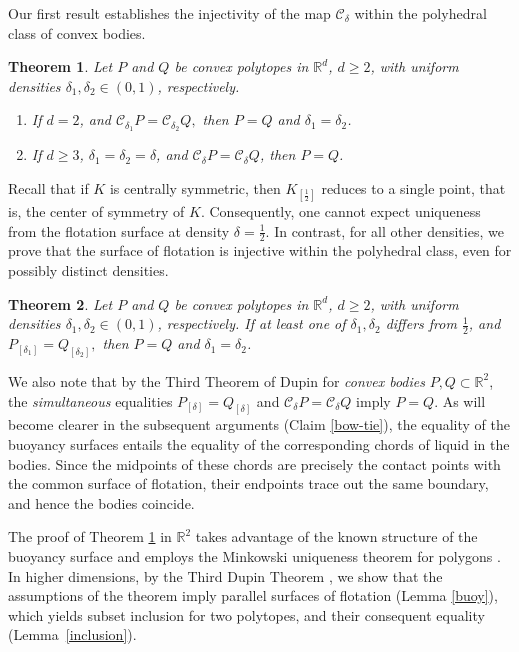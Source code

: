 \documentclass[12pt,letterpaper,reqno]{amsart}
\newtheorem{theorem}{Theorem}
\begin{document}
Our first result establishes the injectivity of the map
\(\mathcal{C}_\delta\) within the polyhedral class of convex bodies.

\begin{theorem}\label{buoyTHM}
    Let $P$ and $Q$ be convex polytopes in $\mathbb{R}^{d}$, $d \geq 2$, with uniform densities $\delta_1, \delta_2 \in (0,1)$, respectively. 
    \begin{enumerate}
        \item If $d=2$, and  $\mathcal{C}_{\delta_1} P = \mathcal{C}_{\delta_2} Q,$ then $P= Q$ and $\delta_1 = \delta_2$.
        \item If $d \geq 3$, $\delta_1 = \delta_2 = \delta$, and $\mathcal{C}_{\delta} P = \mathcal{C}_{\delta} Q$, then $P=Q$.
    \end{enumerate}
    
\end{theorem}
Recall that if \(K\) is centrally symmetric, then
\(K_{[\frac12]}\) reduces to a single point, that is, the center of
symmetry of \(K\). Consequently, one cannot expect uniqueness from
the flotation surface at density \(\delta=\frac12\). In contrast,
for all other densities, we prove that the surface of flotation is
injective within the polyhedral class, even for possibly distinct
densities.
\begin{theorem}\label{floatingTHM}
    Let $P$ and $Q$ be convex polytopes in $\mathbb{R}^{d}$, $d \geq 2$, with uniform densities $\delta_1, \delta_2 \in (0,1)$, respectively. If at least one of $\delta_1, \delta_2$ differs from $\frac{1}{2}$, and
    $
    P_{[\delta_1]} = Q_{[\delta_2]},
    $
    then $P = Q$ and $\delta_1 = \delta_2$.
\end{theorem}

We also note that by the Third Theorem of Dupin \cite{R23,Z} for \textit{convex bodies} $P, Q \subset \mathbb{R}^2$, the \textit{simultaneous} equalities $P_{[\delta]} = Q_{[\delta]}$ and $\mathcal{C}_{\delta}P = \mathcal{C}_{\delta}Q$ imply $P = Q$. As will become clearer in the subsequent arguments (Claim \ref{bow-tie}), the equality of the buoyancy surfaces entails the equality of the corresponding chords of liquid in the bodies. Since the midpoints of these chords are precisely the contact points with the common surface of flotation, their endpoints trace out the same boundary, and hence the bodies coincide.

The proof of Theorem \ref{buoyTHM} in $\mathbb{R}^2$ takes advantage of the known structure of the buoyancy surface \cite{Z} and employs the Minkowski uniqueness theorem for polygons \cite{S}. In higher dimensions, by the Third Dupin Theorem \cite{R23, VP}, we show that the assumptions of the theorem imply parallel surfaces of flotation (Lemma \ref{buoy}), which yields subset inclusion for two polytopes, and their consequent equality (Lemma~\ref{inclusion}).
\end{document}

